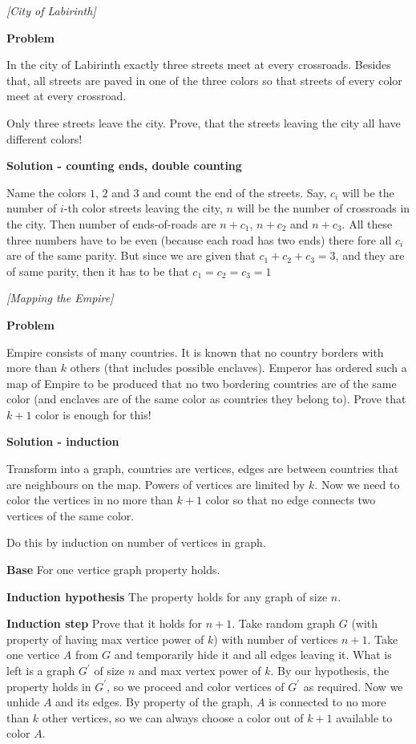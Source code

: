 \begin{problem}
\textit{[City of Labirinth]}

\textbf{Problem}

In the city of Labirinth exactly three streets meet at every crossroads. Besides that, all streets are paved in one of the three colors so that streets of every color meet at every crossroad.
 
Only three streets leave the city. Prove, that the streets leaving the city all have different colors! 


\textbf{Solution - counting ends, double counting}

Name the colors $1$, $2$ and $3$ and count the end of the streets. Say, $c_i$ will be the number of $i$-th color streets leaving the city, $n$ will be the number of crossroads in the city. Then number of ends-of-roads are $n+c_1$,  $n+c_2$ and $n+c_3$. All these three numbers have to be even (because each road has two ends) there fore all $c_i$ are of the same parity. 
But since we are given that $c_1 + c_2 + c_3 = 3$, and they are of same parity, then it has to be that $c_1=c_2=c_3=1$

\end{problem}
%

\begin{problem}
\textit{[Mapping the Empire]}

\textbf{Problem}

Empire consists of many countries. It is known that no country borders with more than $k$ others (that includes possible enclaves). Emperor has ordered such a map of Empire to be produced that no two bordering countries are of the same color (and enclaves are of the same color as countries they belong to). Prove that $k+1$ color is enough for this!

\textbf{Solution - induction}

Transform into a graph, countries are vertices, edges are between countries that are neighbours on the map. Powers of vertices are limited by $k$. Now we need to color the vertices in no more than $k+1$ color so that no edge connects two vertices of the same color.

Do this by induction on number of vertices in graph.

\textbf{Base}
For one vertice graph property holds.

\textbf{Induction hypothesis }
The property holds for any graph of size $n$.

\textbf{Induction step}
Prove that it holds for $n+1$. 
Take random graph $G$ (with property of having max vertice power of $k$) with number of vertices $n+1$. Take one vertice $A$ from $G$ and temporarily hide it and all edges leaving it. What is left is a graph $G^\prime$ of size $n$ and max vertex power of $k$. By our hypothesis, the property holds in $G^\prime$, so we proceed and color vertices of $G^\prime$ as required.
Now we unhide $A$ and its edges. By property of the graph, $A$ is connected to no more than $k$ other vertices, so we can always choose a color out of $k+1$ available to color $A$.



\end{problem}
%

